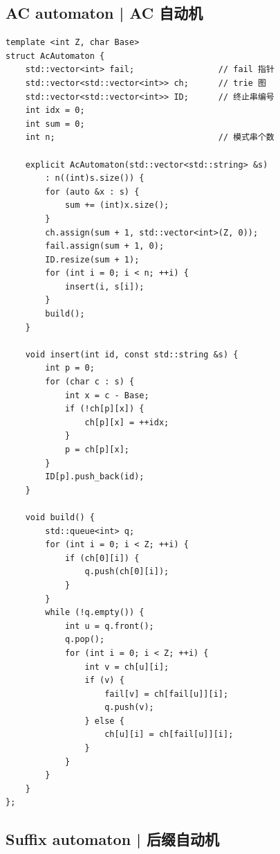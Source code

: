 \subsection{AC automaton | AC 自动机}


    \begin{lstlisting}
template <int Z, char Base>
struct AcAutomaton {
    std::vector<int> fail;                 // fail 指针
    std::vector<std::vector<int>> ch;      // trie 图
    std::vector<std::vector<int>> ID;      // 终止串编号
    int idx = 0;
    int sum = 0;
    int n;                                 // 模式串个数

    explicit AcAutomaton(std::vector<std::string> &s)
        : n((int)s.size()) {
        for (auto &x : s) {
            sum += (int)x.size();
        }
        ch.assign(sum + 1, std::vector<int>(Z, 0));
        fail.assign(sum + 1, 0);
        ID.resize(sum + 1);
        for (int i = 0; i < n; ++i) {
            insert(i, s[i]);
        }
        build();
    }

    void insert(int id, const std::string &s) {
        int p = 0;
        for (char c : s) {
            int x = c - Base;
            if (!ch[p][x]) {
                ch[p][x] = ++idx;
            }
            p = ch[p][x];
        }
        ID[p].push_back(id);
    }

    void build() {
        std::queue<int> q;
        for (int i = 0; i < Z; ++i) {
            if (ch[0][i]) {
                q.push(ch[0][i]);
            }
        }
        while (!q.empty()) {
            int u = q.front();
            q.pop();
            for (int i = 0; i < Z; ++i) {
                int v = ch[u][i];
                if (v) {
                    fail[v] = ch[fail[u]][i];
                    q.push(v);
                } else {
                    ch[u][i] = ch[fail[u]][i];
                }
            }
        }
    }
};
    \end{lstlisting}

\subsection{Suffix automaton | 后缀自动机}


